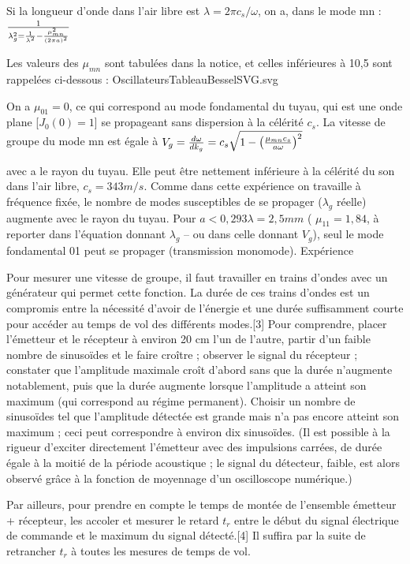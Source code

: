 \documentclass{article}%
\begin{document}
Si la longueur d'onde dans l'air libre est $\lambda = 2\pi c_s/\omega$, on a, dans le mode mn :
$ 1\over \lambda_{g}^2 = {1\over\lambda^2} - {\mu_{mn}^2\over (2\pi a)^2}$

Les valeurs des $\mu_{mn}$ sont tabulées dans la notice, et celles inférieures à 10,5 sont rappelées ci-dessous :
OscillateursTableauBesselSVG.svg


On a $\mu_{01}=0$, ce qui correspond au mode fondamental du tuyau, qui est une onde plane [$J_0(0)=1$] se propageant sans dispersion à la célérité $c_s$. La vitesse de groupe du mode mn est égale à
$ V_{g} = \frac{d\omega}{dk_g} = c_{s}\sqrt{1 - \left({\mu_{mn} c_s \over a \omega}\right)^2}$

avec a le rayon du tuyau. Elle peut être nettement inférieure à la célérité du son dans l'air libre, $c_{s} = 343  m/s$. Comme dans cette expérience on travaille à fréquence fixée, le nombre de modes susceptibles de se propager ($\lambda_{g}$ réelle) augmente avec le rayon du tuyau. Pour $a <0,293 \lambda =2,5 mm$ ( $\mu _{11} = 1,84$, à reporter dans l'équation donnant $\lambda_{g}$ -- ou dans celle donnant $V_{g}$), seul le mode fondamental 01 peut se propager (transmission monomode).
Expérience

Pour mesurer une vitesse de groupe, il faut travailler en trains d'ondes avec un générateur qui permet cette fonction. La durée de ces trains d'ondes est un compromis entre la nécessité d'avoir de l'énergie et une durée suffisamment courte pour accéder au temps de vol des différents modes.[3] Pour comprendre, placer l'émetteur et le récepteur à environ 20 cm l'un de l'autre, partir d'un faible nombre de sinusoïdes et le faire croître ; observer le signal du récepteur ; constater que l'amplitude maximale croît d'abord sans que la durée n'augmente notablement, puis que la durée augmente lorsque l'amplitude a atteint son maximum (qui correspond au régime permanent). Choisir un nombre de sinusoïdes tel que l'amplitude détectée est grande mais n'a pas encore atteint son maximum ; ceci peut correspondre à environ dix sinusoïdes. (Il est possible à la rigueur d'exciter directement l'émetteur avec des impulsions carrées, de durée égale à la moitié de la période acoustique ; le signal du détecteur, faible, est alors observé grâce à la fonction de moyennage d'un oscilloscope numérique.)

Par ailleurs, pour prendre en compte le temps de montée de l'ensemble {émetteur + récepteur}, les accoler et mesurer le retard $t_{r}$ entre le début du signal électrique de commande et le maximum du signal détecté.[4] Il suffira par la suite de retrancher $t_{r}$ à toutes les mesures de temps de vol.
\end{document}
